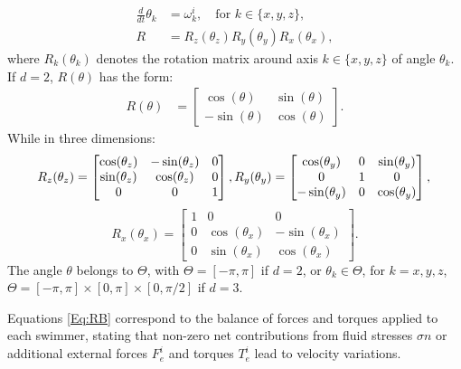 \documentclass[graybox]{svmult}
\newcommand{\angvel}{\omega} %
\newcommand{\Rmat}{R} %
\newcommand{\Angle}{\theta}
\begin{document}
\begin{equation*}
	\begin{aligned}
		\frac{d}{dt} \Angle_k &= \angvel^i_k, \quad \text{for $k \in \{x,y,z\}$},\\
		\Rmat &=\Rmat_z(\Angle_z)\Rmat_y(\Angle_y)\Rmat_x(\Angle_x),
	\end{aligned}
\end{equation*}
where $R_k(\Angle_k)$ denotes the rotation matrix around axis $k \in \{x,y,z\}$ of 
angle $\Angle_k$. If $d=2$, $R(\theta)$ has the form: 
\begin{equation*}
	\begin{aligned}
		\Rmat(\Angle) &= \begin{bmatrix}
			\cos(\Angle) & \sin(\Angle)\\
			-\sin(\Angle) & \cos(\Angle)
		\end{bmatrix}.
	\end{aligned}
\end{equation*}
While in three dimensions:
$$	
	\Rmat_z(\Angle_z) = \begin{bmatrix}
		\cos(\Angle_z) & -\sin(\Angle_z) & 0\\
		\sin(\Angle_z) & \cos(\Angle_z)& 0 \\
		0& 0 & 1
	\end{bmatrix},
	\Rmat_y(\Angle_y) = \begin{bmatrix}
		\cos(\Angle_y) &0 & \sin(\Angle_y) \\
		0& 1& 0\\
		-\sin(\Angle_y) & 0& \cos(\Angle_y)
	\end{bmatrix},\\
$$
$$
	\Rmat_x(\Angle_x) = \begin{bmatrix}
		1 & 0 & 0\\
		0 &\cos(\Angle_x) & -\sin(\Angle_x) \\
		0 &\sin(\Angle_x) & \cos(\Angle_x) 
	\end{bmatrix}.
$$
The angle $\Angle$ belongs to  $\Theta$, with $\Theta = [-\pi,\pi]$ if $d=2$, 
or $\Angle_k \in \Theta$, for $k=x,y,z$, $\Theta=[-\pi,\pi]\times[0,\pi]\times[0,\pi/2]$ if $d=3$.

Equations \eqref{Eq:RB} correspond to the balance of forces and torques applied to each swimmer, stating that non-zero net contributions from fluid stresses $\sigma n$ or additional external forces $F_e^i$ and torques $T_e^i$ lead to velocity variations.

\end{document}
